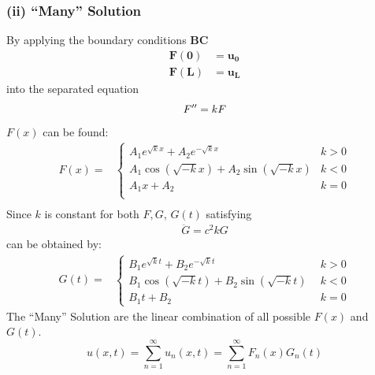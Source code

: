 \subsubsection{(ii) ``Many'' Solution}
By applying the boundary conditions \textbf{BC}
\begin{align*}
    \mathbf{F(0)} & =\mathbf{u_0} \\
    \mathbf{F(L)} & =\mathbf{u_L}
\end{align*}
into the separated equation
\begin{equation*}
    F''=kF \\
\end{equation*}
$F(x)$ can be found:
\begin{align*}
    F(x)= &
    \begin{cases}
        A_1e^{\sqrt{k}x}+A_2e^{-\sqrt{k}x}      & k>0 \\
        A_1\cos(\sqrt{-k}x)+A_2\sin(\sqrt{-k}x) & k<0 \\
        A_1x+A_2                                & k=0 \\
    \end{cases} \\
\end{align*}
Since $k$ is constant for both $F,G$, $G(t)$ satisfying
\begin{align*}
    \ddot{G}=c^2kG
\end{align*}
can be obtained by:
\begin{align*}
    G(t)= &
    \begin{cases}
        B_1e^{\sqrt{k}t}+B_2e^{-\sqrt{k}t}      & \;\,k>0 \\
        B_1\cos(\sqrt{-k}t)+B_2\sin(\sqrt{-k}t) & \;\,k<0 \\
        B_1t+B_2                                & \;\,k=0
    \end{cases}
\end{align*}
The ``Many'' Solution are the linear combination of all possible $F(x)$ and $G(t)$.
\begin{equation*}
    u(x, t) = \sum_{n=1}^{\infty}u_n(x,t) = \sum_{n=1}^{\infty}F_n(x)G_n(t)
\end{equation*}

